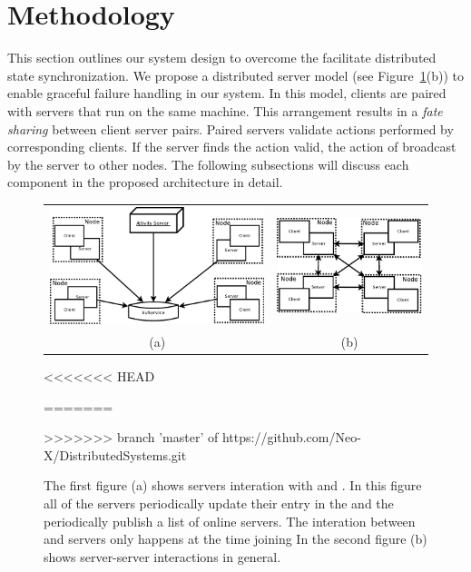 
\section{Methodology}
\label{sec:methodology}

	This section outlines our system design to overcome the facilitate distributed state synchronization. We propose a distributed server model (see Figure~\ref{figure:server-models}(b)) to enable graceful failure handling in our system. In this model, clients are paired with servers that run on the same machine. This arrangement results in a \emph{fate sharing} between client server pairs. Paired servers validate actions performed by corresponding clients. If the server finds the action valid, the action of broadcast by the server to other nodes. The following subsections will discuss each component in the proposed architecture in detail.

\begin{figure}[ht]
	\centering
	\begin{tabular}{c c}
		
		\includegraphics[width=0.52\linewidth]{../images/client-distributed-server-model-Activity-crop.pdf} &
		\includegraphics[width=0.40\linewidth]{../images/client-distributed-server-model-crop.pdf} \\
		(a) & (b)
	\end{tabular}
	
<<<<<<< HEAD
	\caption{\label{figure:server-models} Figure (a) shows servers interacting with \activityServer and \kvService. In this model all of the servers periodically update their entry in the \kvService and the \activityServer periodically publish a list of online servers in the \kvService. The model in figure (b) shows node-node interactions in general.}
=======
	\caption{\label{figure:server-models} The first figure (a) shows servers interation with \activityServer and \kvService. In this figure all of the servers periodically update their entry in the \kvService and the \activityServer periodically publish a list of online servers. The interation between \activityServer and servers only happens at the time joining In the second figure (b) shows server-server interactions in general.}
>>>>>>> branch 'master' of https://github.com/Neo-X/DistributedSystems.git
\end{figure}


